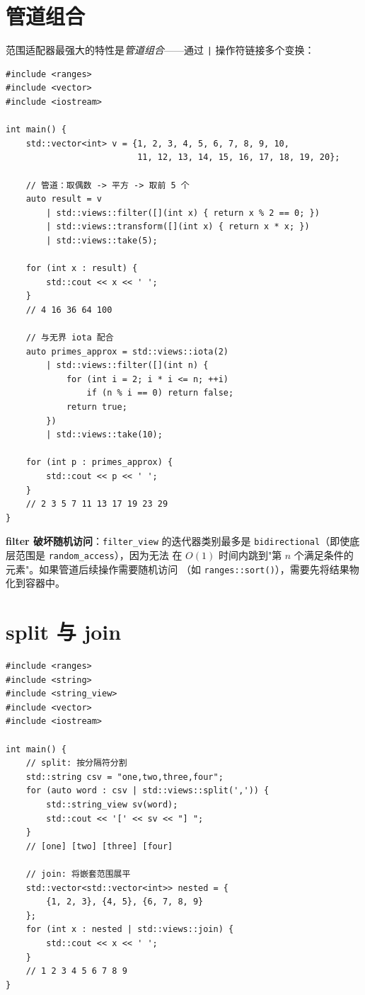 \documentclass[12pt,a4paper,fontset=fandol]{ctexbook}
\newcommand{\Fn}[1]{\texttt{#1()}}
\begin{document}
\section{管道组合}

范围适配器最强大的特性是\emph{管道组合}——通过 \texttt{|} 操作符链接多个变换：

\begin{lstlisting}
#include <ranges>
#include <vector>
#include <iostream>

int main() {
    std::vector<int> v = {1, 2, 3, 4, 5, 6, 7, 8, 9, 10,
                          11, 12, 13, 14, 15, 16, 17, 18, 19, 20};

    // 管道：取偶数 -> 平方 -> 取前 5 个
    auto result = v
        | std::views::filter([](int x) { return x % 2 == 0; })
        | std::views::transform([](int x) { return x * x; })
        | std::views::take(5);

    for (int x : result) {
        std::cout << x << ' ';
    }
    // 4 16 36 64 100

    // 与无界 iota 配合
    auto primes_approx = std::views::iota(2)
        | std::views::filter([](int n) {
            for (int i = 2; i * i <= n; ++i)
                if (n % i == 0) return false;
            return true;
        })
        | std::views::take(10);

    for (int p : primes_approx) {
        std::cout << p << ' ';
    }
    // 2 3 5 7 11 13 17 19 23 29
}
\end{lstlisting}

\begin{warning}
\textbf{filter 破坏随机访问}：\texttt{filter\_view} 的迭代器类别最多是
\texttt{bidirectional}（即使底层范围是 \texttt{random\_access}），因为无法
在 $O(1)$ 时间内跳到"第 $n$ 个满足条件的元素"。如果管道后续操作需要随机访问
（如 \Fn{ranges::sort}），需要先将结果物化到容器中。
\end{warning}

\section{split 与 join}

\begin{lstlisting}
#include <ranges>
#include <string>
#include <string_view>
#include <vector>
#include <iostream>

int main() {
    // split: 按分隔符分割
    std::string csv = "one,two,three,four";
    for (auto word : csv | std::views::split(',')) {
        std::string_view sv(word);
        std::cout << '[' << sv << "] ";
    }
    // [one] [two] [three] [four]

    // join: 将嵌套范围展平
    std::vector<std::vector<int>> nested = {
        {1, 2, 3}, {4, 5}, {6, 7, 8, 9}
    };
    for (int x : nested | std::views::join) {
        std::cout << x << ' ';
    }
    // 1 2 3 4 5 6 7 8 9
}
\end{lstlisting}
\end{document}
